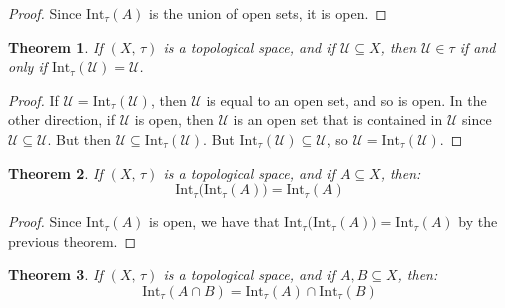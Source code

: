 \documentclass{article}
\theoremstyle{plain}
\newtheorem{theorem}{Theorem}[section]
\theoremstyle{normal}
\begin{document}
        \begin{proof}
            Since $\textrm{Int}_{\tau}(A)$ is the union of open sets, it is
            open.
        \end{proof}
        \begin{theorem}
            If $(X,\,\tau)$ is a topological space, and if
            $\mathcal{U}\subseteq{X}$, then $\mathcal{U}\in\tau$ if and only
            if $\textrm{Int}_{\tau}(\mathcal{U})=\mathcal{U}$.
        \end{theorem}
        \begin{proof}
            If $\mathcal{U}=\textrm{Int}_{\tau}(\mathcal{U})$, then
            $\mathcal{U}$ is equal to an open set, and so is open. In the
            other direction, if $\mathcal{U}$ is open, then
            $\mathcal{U}$ is an open set that is contained in $\mathcal{U}$ since
            $\mathcal{U}\subseteq\mathcal{U}$. But then
            $\mathcal{U}\subseteq\textrm{Int}_{\tau}(\mathcal{U})$. But
            $\textrm{Int}_{\tau}(\mathcal{U})\subseteq\mathcal{U}$, so
            $\mathcal{U}=\textrm{Int}_{\tau}(\mathcal{U})$.
        \end{proof}
        \begin{theorem}
            If $(X,\,\tau)$ is a topological space, and if $A\subseteq{X}$,
            then:
            \begin{equation}
                \textrm{Int}_{\tau}\big(\textrm{Int}_{\tau}(A)\big)
                =\textrm{Int}_{\tau}(A)
            \end{equation}
        \end{theorem}
        \begin{proof}
            Since $\textrm{Int}_{\tau}(A)$ is open, we have that
            $\textrm{Int}_{\tau}\big(\textrm{Int}_{\tau}(A)\big)=\textrm{Int}_{\tau}(A)$
            by the previous theorem.
        \end{proof}
        \begin{theorem}
            If $(X,\,\tau)$ is a topological space, and if
            $A,B\subseteq{X}$, then:
            \begin{equation}
                \textrm{Int}_{\tau}(A\cap{B})
                =\textrm{Int}_{\tau}(A)\cap\textrm{Int}_{\tau}(B)
            \end{equation}
        \end{theorem}
\end{document}
